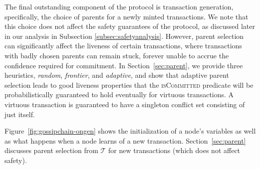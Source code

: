 
The final outstanding component of the protocol is transaction generation, specifically, the choice of parents for a newly minted transactions.
We note that this choice does not affect the safety guarantees of the protocol, as discussed later in our analysis in Subsection \ref{subsec:safetyanalysis}. 
However, parent selection can significantly affect the liveness of certain transactions, where transactions with badly chosen parents can remain stuck, forever unable to accrue the confidence required for commitment. 
In Section~\ref{sec:parent}, we provide three heuristics,
\emph{random}, \emph{frontier}, and \emph{adaptive}, and show that adaptive parent selection leads to good liveness properties that the \textsc{isCommitted} predicate will be probabilistically guaranteed to hold eventually for virtuous transactions.
A virtuous transaction is guaranteed to have a singleton conflict set consisting of just itself.

Figure~\ref{fig:gossipchain-ongen} shows the initialization of
a node's variables as well as what happens when a node learns of a
new transaction.  Section~\ref{sec:parent} discusses parent
selection from $\mathcal{T}$ for new transactions (which does not
affect safety).

